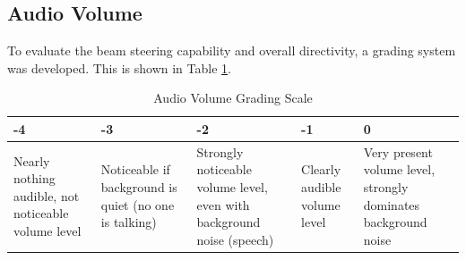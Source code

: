 \subsection{Audio Volume}
To evaluate the beam steering capability and overall directivity, a grading system was developed. This is shown in Table \ref{6.1.3_tab:audio_volume}.

\begin{center}
\begin{table}[h!]
\centering
\begin{tabular}{ |m{2.2cm}|m{2.2cm}|m{2.2cm}|m{2.2cm}|m{2.2cm}|}
  \hline 
  -4 & -3 & -2 & -1 & 0\\ 
  \hline
Nearly nothing audible, not noticeable volume level &	Noticeable if background is quiet (no one is talking) &	Strongly noticeable volume level, even with background noise (speech) &	Clearly audible volume level & Very present volume level, strongly dominates background noise
\\
 \hline
\end{tabular}
\caption{Audio Volume Grading Scale}
\label{6.1.3_tab:audio_volume}
\end{table}
\end{center}

